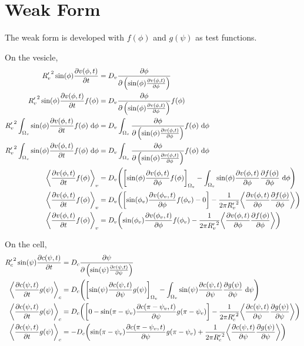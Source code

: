 \documentclass{report}
\newcommand\Par[1]{{ \left({#1}\right) }}
\newcommand\Brack[1]{{ \left[{#1}\right] }}
\newcommand\Angle[1]{{ \left\langle{#1}\right\rangle }}
\newcommand\Rc{{ R'_c }}
\newcommand\Rv{{ R'_v }}
\begin{document}
\section{Weak Form}
The weak form is developed with $f(\phi)$ and $g(\psi)$ as test functions.

On the vesicle,
\begin{align*}
	\Rv^2 \sin(\phi) \pdv{v(\phi, t)}{t} &= D_v \pdv\phi \Par{\sin(\phi) \pdv{v(\phi, t)}{\phi}} \\
	\Rv^2 \sin(\phi) \pdv{v(\phi, t)}{t} f(\phi) &= D_v \pdv\phi \Par{\sin(\phi) \pdv{v(\phi, t)}{\phi}} f(\phi) \\
	\Rv^2 \int_{\Omega_v} \sin(\phi) \pdv{v(\phi, t)}{t} f(\phi)\ \dd\phi &= D_v \int_{\Omega_v} \pdv\phi \Par{\sin(\phi) \pdv{v(\phi, t)}{\phi}} f(\phi)\ \dd\phi \\
	\Rv^2 \int_{\Omega_v} \sin(\phi) \pdv{v(\phi, t)}{t} f(\phi)\ \dd\phi &= D_v \int_{\Omega_v} \pdv\phi \Par{\sin(\phi) \pdv{v(\phi, t)}{\phi}} f(\phi)\ \dd\phi \\
	\Angle{\pdv{v(\phi, t)}{t} f(\phi)}_v &= D_v \Par{\Brack{\sin(\phi) \pdv{v(\phi, t)}{\phi} f(\phi)}_{\Omega_v} - \int_{\Omega_v} \sin(\phi) \pdv{v(\phi, t)}{\phi} \pdv{f(\phi)}{\phi}\ \dd\phi} \\
	\Angle{\pdv{v(\phi, t)}{t} f(\phi)}_v &= D_v \Par{\Brack{\sin(\phi_v) \pdv{v(\phi_v, t)}{\phi} f(\phi_v) - 0} - \frac{1}{2\pi \Rv^2} \Angle{\pdv{v(\phi, t)}{\phi} \pdv{f(\phi)}{\phi}}} \\
	\Angle{\pdv{v(\phi, t)}{t} f(\phi)}_v &= D_v \Par{\sin(\phi_v) \pdv{v(\phi_v, t)}{\phi} f(\phi_v) - \frac{1}{2\pi \Rv^2} \Angle{\pdv{v(\phi, t)}{\phi} \pdv{f(\phi)}{\phi}}}
\end{align*}

On the cell,
\begin{align*}
	\Rc^2 \sin(\psi) \pdv{c(\psi, t)}{t} &= D_c \pdv\psi \Par{\sin(\psi) \pdv{c(\psi, t)}{\psi}} \\
	\Angle{\pdv{c(\psi, t)}{t} g(\psi)}_c &= D_c \Par{\Brack{\sin(\psi) \pdv{c(\psi, t)}{\psi} g(\psi)}_{\Omega_v} - \int_{\Omega_v} \sin(\psi) \pdv{c(\psi, t)}{\psi} \pdv{g(\psi)}{\psi}\ \dd\psi} \\
	\Angle{\pdv{c(\psi, t)}{t} g(\psi)}_c &= D_c \Par{\Brack{0 - \sin(\pi - \psi_v) \pdv{c(\pi - \psi_v, t)}{\psi} g(\pi - \psi_v)} - \frac{1}{2\pi \Rc^2} \Angle{\pdv{c(\psi, t)}{\psi} \pdv{g(\psi)}{\psi}}} \\
	\Angle{\pdv{c(\psi, t)}{t} g(\psi)}_c &= -D_c \Par{\sin(\pi - \psi_v) \pdv{c(\pi - \psi_v, t)}{\psi} g(\pi - \psi_v) + \frac{1}{2\pi \Rc^2} \Angle{\pdv{c(\psi, t)}{\psi} \pdv{g(\psi)}{\psi}}}
\end{align*}
\end{document}
